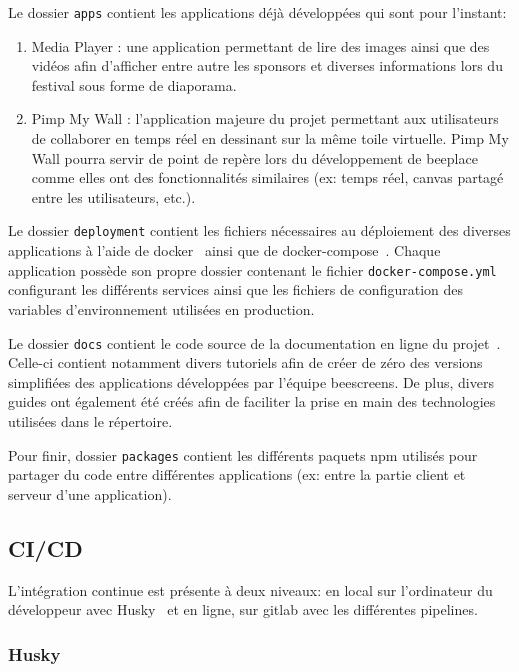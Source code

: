 Le dossier \texttt{apps} contient les applications déjà développées qui sont pour l'instant:

\begin{enumerate}
  \item Media Player : une application permettant de lire des images ainsi que des vidéos afin d'afficher entre autre les sponsors et diverses informations lors du festival sous forme de diaporama.
  \item Pimp My Wall : l'application majeure du projet permettant aux utilisateurs de collaborer en temps réel en dessinant sur la même toile virtuelle. Pimp My Wall pourra servir de point de repère lors du développement de \gls{beeplace} comme elles ont des fonctionnalités similaires (ex: temps réel, canvas partagé entre les utilisateurs, etc.).
\end{enumerate}

Le dossier \texttt{deployment} contient les fichiers nécessaires au déploiement des diverses applications à l'aide de \gls{docker}~\cite{docker} ainsi que de \gls{docker-compose}~\cite{docker-compose}. Chaque application possède son propre dossier contenant le fichier  \texttt{docker-compose.yml} configurant les différents services ainsi que les fichiers de configuration des variables d'environnement utilisées en production.

Le dossier \texttt{docs} contient le code source de la documentation en ligne du projet~\cite{beescreensdocs}. Celle-ci contient notamment divers tutoriels afin de créer de zéro des versions simplifiées des applications développées par l'équipe \gls{beescreens}. De plus, divers guides ont également été créés afin de faciliter la prise en main des technologies utilisées dans le répertoire.

Pour finir, dossier \texttt{packages} contient les différents paquets \gls{npm} utilisés pour partager du code entre différentes applications (ex: entre la partie client et serveur d'une application).

\subsection{CI/CD}

L'intégration continue est présente à deux niveaux: en local sur l'ordinateur du développeur avec Husky~\cite{husky} et en ligne, sur \gls{gitlab} avec les différentes pipelines.

\subsubsection{Husky}

